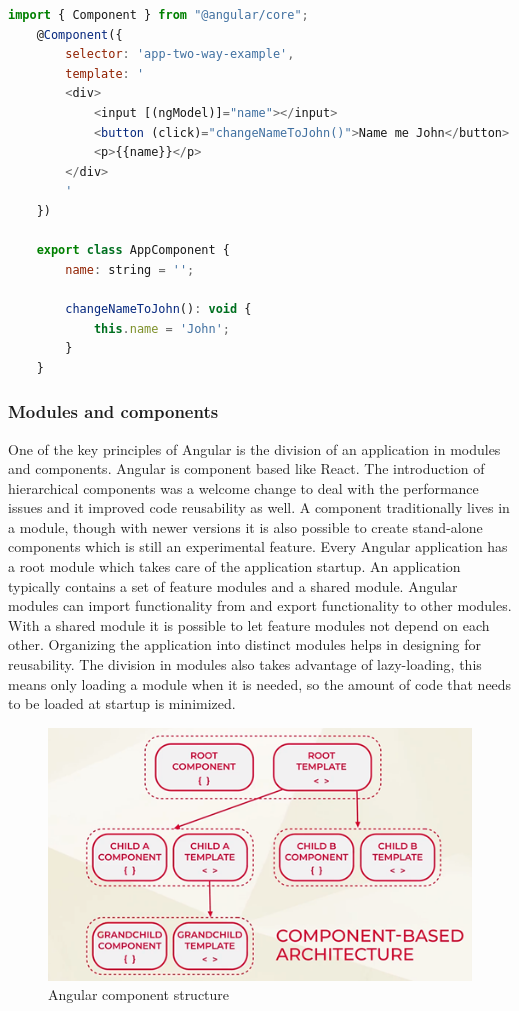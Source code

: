 \begin{lstlisting}[language=Javascript]
	import { Component } from "@angular/core";
	@Component({
		selector: 'app-two-way-example',
		template: '
		<div>
			<input [(ngModel)]="name"></input>
			<button (click)="changeNameToJohn()">Name me John</button>
			<p>{{name}}</p>
		</div>
		'
	})
	
	export class AppComponent {
		name: string = '';
		
		changeNameToJohn(): void {
			this.name = 'John';
		}
	}
\end{lstlisting}


\subsubsection{Modules and components}
One of the key principles of Angular is the division of an application in modules and components.
Angular is component based like React. The introduction of hierarchical components was a welcome change to deal with the performance issues and it improved code reusability as well. A component traditionally lives in a module, though with newer versions it is also possible to create stand-alone components which is still an experimental feature.
Every Angular application has a root module which takes care of the application startup. An application typically contains a set of feature modules and a shared module. Angular modules can import functionality from and export functionality to other modules. With a shared module it is possible to let feature modules not depend on each other. Organizing the application into distinct modules helps in designing for reusability. The division in modules also takes advantage of lazy-loading, this means only loading a module when it is needed, so the amount of code that needs to be loaded at startup is minimized. 
\autocite{Angular.io}

\begin{figure}[h!]
    \caption{Angular component structure}
    \centering
    \includegraphics[width=\textwidth]{img/angularcomponent.png} 
\end{figure}

